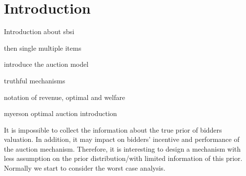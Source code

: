 \chapter{Introduction}
\label{ch:introduction}
Introduction about sbsi

then single multiple items

introduce the auction model 

truthful mechanisms

notation of revenue, optimal and welfare

myerson optimal auction introduction


It is impossible to collect the information about the true prior of bidders valuation. In addition, it may impact on bidders' incentive and performance of the auction mechanism. Therefore, it is interesting to design a mechanism with less assumption on the prior distribution/with limited information of this prior. Normally we start to consider the worst case analysis.





